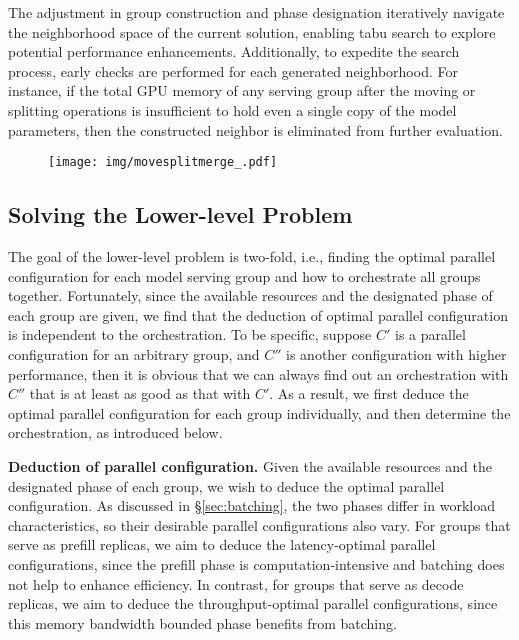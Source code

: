 % 
The adjustment in group construction and phase designation iteratively navigate the neighborhood space of the current solution, enabling tabu search to explore potential performance enhancements.
Additionally, to expedite the search process, early checks are performed for each generated neighborhood. For instance, if the total GPU memory of any serving group after the moving or splitting operations is insufficient to hold even a single copy of the model parameters, then the constructed neighbor is eliminated from further evaluation.


\begin{figure}[!t]
  \centering
  \texttt{[image: img/movesplitmerge\_.pdf]} %
  \vspace{-1em}
  \caption{}
  \label{fig:tabusearch graph}
  \vspace{-1em}
\end{figure}


\subsection{Solving the Lower-level Problem}
\label{sec:schedule_lower_level}
The goal of the lower-level problem is two-fold, i.e., finding the optimal parallel configuration for each model serving group and how to orchestrate all groups together. Fortunately, since the available resources and the designated phase of each group are given, we find that the deduction of optimal parallel configuration is independent to the orchestration. To be specific, suppose $C'$ is a parallel configuration for an arbitrary group, and $C''$ is another configuration with higher performance, then it is obvious that we can always find out an orchestration with $C''$ that is at least as good as that with $C'$. As a result, we first deduce the optimal parallel configuration for each group individually, and then determine the orchestration, as introduced below. 


\noindent \textbf{Deduction of parallel configuration.} Given the available resources and the designated phase of each group, we wish to deduce the optimal parallel configuration. 
As discussed in \S\ref{sec:batching}, the two phases differ in workload characteristics, so their desirable parallel configurations also vary. 
For groups that serve as prefill replicas, we aim to deduce the latency-optimal parallel configurations, since the prefill phase is computation-intensive and batching does not help to enhance efficiency.
In contrast, for groups that serve as decode replicas, we aim to deduce the throughput-optimal parallel configurations, since this memory bandwidth bounded phase benefits from batching. 

